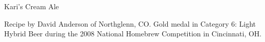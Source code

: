\begin{recipe}{Kari's Cream Ale}

\begin{aboutblock}
Recipe by David Anderson of Northglenn, CO. Gold medal in Category 6: Light
Hybrid Beer during the 2008 National Homebrew Competition in Cincinnati, OH.
\sourceaha
\end{aboutblock}


\begin{methodandtiming}

\begin{mashsteps}
\end{mashsteps}

\begin{fermentationsteps}
\end{fermentationsteps}

\end{methodandtiming}

\recipebreak

\begin{ingredientsblock}

\begin{malts}
\end{malts}

\begin{hops}
\end{hops}


\end{ingredientsblock}

\end{recipe}

